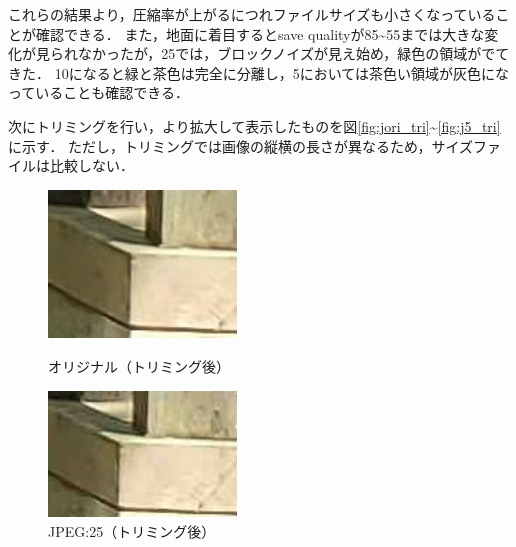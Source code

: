 \documentclass[a4paper,11pt]{bxjsarticle}
\begin{document}
これらの結果より，圧縮率が上がるにつれファイルサイズも小さくなっていることが確認できる．
また，地面に着目するとsave qualityが85\textasciitilde55までは大きな変化が見られなかったが，25では，ブロックノイズが見え始め，緑色の領域がでてきた．
10になると緑と茶色は完全に分離し，5においては茶色い領域が灰色になっていることも確認できる．

次にトリミングを行い，より拡大して表示したものを図\ref{fig:jori_tri}\textasciitilde\ref{fig:j5_tri}に示す．
ただし，トリミングでは画像の縦横の長さが異なるため，サイズファイルは比較しない．

\begin{figure}[htbp]
  \begin{minipage}{0.5\hsize}
   \begin{center}
    \includegraphics[width=50mm]{sample_tri.jpg}
   \end{center}
   \caption{オリジナル（トリミング後）}
   \label{fig:jori_tri}
  \end{minipage}
  \begin{minipage}{0.5\hsize}
   \begin{center}
    \includegraphics[width=50mm]{sample_j25_tri.jpg}
   \end{center}
   \caption{JPEG:25（トリミング後）}
   \label{fig:j25_tri}
  \end{minipage}
 \end{figure}
\end{document}
